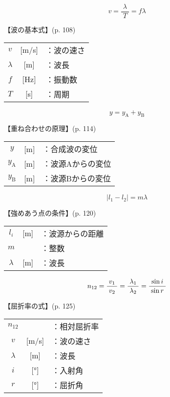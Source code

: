 \documentclass[10pt]{jarticle}
\begin{document}
\newpage



\[
v = \frac{\lambda}{\; T \;} = f \lambda
\]


\vskip3mm
【波の基本式】{\footnotesize (p. 108)}

\begin{tabular}{ccl}
$v$	& [m/s]	&：波の速さ\\
$\lambda$	& [m]	&：波長\\
$f$	& [Hz]	&：振動数\\
$T$	&[s]	&：周期
\end{tabular}

\newpage




\[
y = y_\mathrm{A} + y_\mathrm{B}
\]


\vskip3mm
【重ね合わせの原理】{\footnotesize (p. 114)}

\begin{tabular}{ccl}
$y$	& [m]	&：合成波の変位\\
$y_\mathrm{A}$	& [m]	&：波源Aからの変位\\
$y_\mathrm{B}$	& [m]	&：波源Bからの変位
\end{tabular}

\newpage


\[
| l_1 - l_2 |= m \lambda
\]


\vskip3mm
【強めあう点の条件】{\footnotesize (p. 120)}

\begin{tabular}{ccl}
$l_i$	& [m]	&：波源からの距離\\
$m$	& 	&：整数\\
$\lambda$	& [m]	&：波長
\end{tabular}

\newpage




\[
n_{12}	= \frac{v_1}{\; v_2 \;}
	= \frac{\lambda_1}{\; \lambda_2 \;}
	= \frac{\sin i}{\; \sin r \;} \\
\]


\vskip3mm
【屈折率の式】{\footnotesize (p. 125)}

\begin{tabular}{ccl}
$n_{12}$	&	&：相対屈折率\\
$v$	& [m/s]	&：波の速さ\\
$\lambda$	&[m]	&：波長\\
$i$	&[°]	&：入射角\\
$r$	&[°]	&：屈折角\\
\end{tabular}
\end{document}
